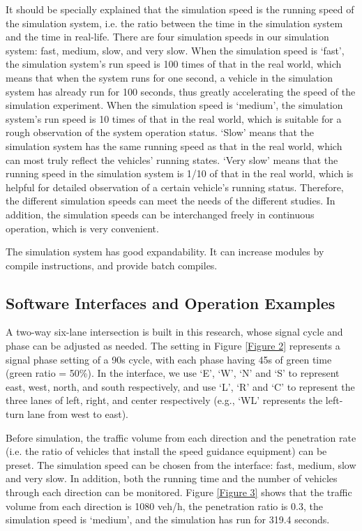 \documentclass[10.5pt,compsoc]{TsT}
\theoremstyle{mystyle}
\begin{document}
{It should be specially explained that the simulation speed is the
running speed of the simulation system, i.e. the ratio between the time
in the simulation system and the time in real-life. There are four
simulation speeds in our simulation system: fast, medium, slow, and very
slow. When the simulation speed is `fast', the simulation system's run
speed is 100 times of that in the real world, which means that when the
system runs for one second, a vehicle in the simulation system has
already run for 100 seconds, thus greatly accelerating the speed of the
simulation experiment. When the simulation speed is `medium', the
simulation system's run speed is 10 times of that in the real world,
which is suitable for a rough observation of the system operation
status. `Slow' means that the simulation system has the same running
speed as that in the real world, which can most truly reflect the
vehicles' running states. `Very slow' means that the running speed in
the simulation system is 1/10 of that in the real world, which is
helpful for detailed observation of a certain vehicle's running status.
Therefore, the different simulation speeds can meet the needs of the
different studies. In addition, the simulation speeds can be
interchanged freely in continuous operation, which is very convenient.

The simulation system has good expandability. It can increase modules by
compile instructions, and provide batch compiles.
\subsection{Software Interfaces and Operation Examples}
\noindent
A two-way six-lane intersection is built in this research, whose signal
cycle and phase can be adjusted as needed. The setting in Figure \ref{Figure 2}
represents a signal phase setting of a 90s cycle, with each phase having
45s of green time (green ratio = 50\%). In the interface, we use `E',
`W', `N' and `S' to represent east, west, north, and south respectively,
and use `L', `R' and `C' to represent the three lanes of left, right,
and center respectively (e.g., `WL' represents the left-turn lane from
west to east).


Before simulation, the traffic volume from each direction and the
penetration rate (i.e. the ratio of vehicles that install the speed
guidance equipment) can be preset. The simulation speed can be chosen
from the interface: fast, medium, slow and very slow. In addition, both
the running time and the number of vehicles through each direction can
be monitored. Figure \ref{Figure 3} shows that the traffic volume from each direction
is 1080 veh/h, the penetration ratio is 0.3, the simulation speed is
`medium', and the simulation has run for 319.4 seconds.


}
\end{document}
